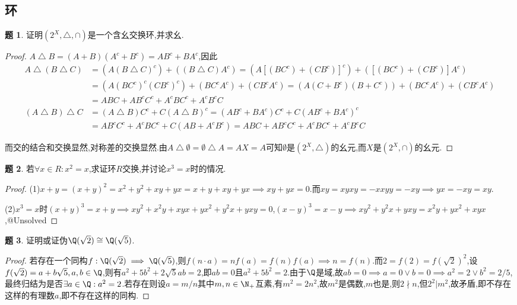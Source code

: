 \documentclass{article}
\theoremstyle{definition}
\newtheorem{exercise}{题}[section]
\begin{document}
\subsection{环}
\begin{exercise}
    证明$(2^X,\bigtriangleup,\cap)$是一个含幺交换环,并求幺.
\end{exercise}
\begin{proof}
    $A\bigtriangleup B=(A+B)(A^c+B^c)=AB^c+BA^c$,因此
$$\begin{aligned}
    A\bigtriangleup (B\bigtriangleup C)
    &=(A(B\bigtriangleup C)^c)+((B\bigtriangleup C)A^c)=(A[(BC^c)+(CB^c)]^c)+([(BC^c)+(CB^c)]A^c)\\
    &=(A(BC^c)^c(CB^c)^c)+(BC^c A^c)+(CB^c A^c)=(A(C+B^c) (B+C^c))+(BC^c A^c)+(CB^c A^c)\\
    &=ABC+AB^c C^c+A^c BC^c+A^c B^c C\\
    (A\bigtriangleup B)\bigtriangleup C&=(A\bigtriangleup B)C^c+C(A\bigtriangleup B)^c=(AB^c+BA^c)C^c+C(AB^c+BA^c)^c\\
    &=AB^c C^c+A^c BC^c+C(AB+A^c B^c)=ABC+AB^c C^c+A^c BC^c+A^c B^c C
\end{aligned}$$

    而交的结合和交换显然,对称差的交换显然.由$A\bigtriangleup \emptyset=\emptyset\bigtriangleup A=AX=A$可知$\emptyset$是$(2^X,\bigtriangleup)$的幺元,而$X$是$(2^X,\cap)$的幺元.
\end{proof}

\begin{exercise}
    若$\forall x\in R: x^2=x$,求证环$R$交换,并讨论$x^3=x$时的情况.
\end{exercise}
\begin{proof}
    (1)$x+y=(x+y)^2=x^2+y^2+xy+yx=x+y+xy+yx\implies xy+yx=0$.而$xy=xyxy=-xxyy=-xy\implies yx=-xy=xy$.

    (2)$x^3=x$时$(x+y)^3=x+y\implies xy^2+x^2y+xyx+yx^2+y^2x+yxy=0$,$(x-y)^3=x-y\implies xy^2+y^2x+yxy=x^2y+yx^2+xyx$,@Unsolved
\end{proof}

\begin{exercise}
    证明或证伪$\Q(\sqrt{2})\cong \Q(\sqrt{5})$.
\end{exercise}
\begin{proof}
    若存在一个同构$f:\Q(\sqrt{2})\implies \Q(\sqrt{5})$,则$f(n\cdot a)=nf(a)=f(n)f(a)\implies n=f(n)$.而$2=f(2)=f(\sqrt{2})^2$,设$f(\sqrt{2})=a+b\sqrt{5}, a,b\in \Q$,则有$a^2+5b^2+2\sqrt{5}ab=2$,即$ab=0$且$a^2+5b^2=2$.由于$\Q$是域,故$ab=0\implies a=0\lor b=0\implies a^2=2\lor b^2=2/5$,最终归结为是否$\exists a\in \Q: a^2=2$.若存在则设$a=m/n$其中$m,n\in \N_+$互素,有$m^2=2n^2$,故$m^2$是偶数,$m$也是,则$2\nmid n$,但$2^2|m^2$,故矛盾,即不存在这样的有理数$a$,即不存在这样的同构.
\end{proof}
\end{document}
